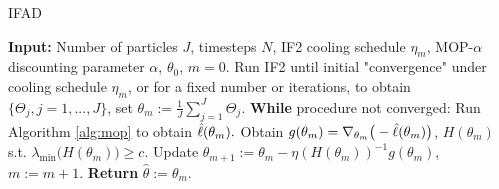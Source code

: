 \documentclass[11pt]{article}
\begin{document}



\begin{algorithm}[H]
	\caption{IFAD}
    \label{alg:ifad}
	    \textbf{Input:} Number of particles $J$, timesteps $N$, IF2 cooling schedule $\eta_m$, MOP-$\alpha$ discounting parameter $\alpha$, $\theta_0$, $m=0.$\newline
        Run IF2 until initial "convergence" under cooling schedule $\eta_m$, or for a fixed number or iterations, to obtain $\{\Theta_j, j=1,...,J\}$, set $\theta_m := \frac{1}{J}\sum_{j=1}^J \Theta_j.$\newline
		\textbf{While} procedure not converged: \newline
		\hspace*{4mm} Run Algorithm \ref{alg:mop} to obtain $\hat{\ell}(\theta_m).$ \newline
		\hspace*{4mm} Obtain $g(\theta_m) = \nabla_{\theta_m} \big(-\hat{\ell}(\theta_m)\big)$, $H(\theta_m)$ s.t. $\lambda_{\min}\big(H(\theta_m)\big) \geq c$. \newline
		\hspace*{4mm} Update $\theta_{m+1} := \theta_m - \eta (H(\theta_m))^{-1} g(\theta_m)$, $m:=m+1.$ \newline
		\textbf{Return} $\hat{\theta} := \theta_m.$
\end{algorithm}
\end{document}
